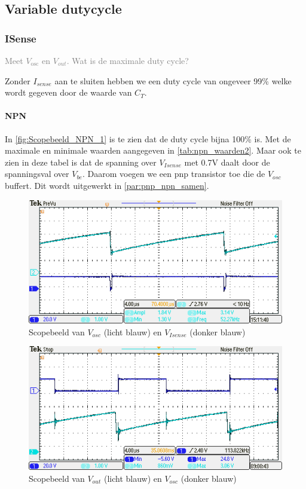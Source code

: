 \subsection{Variable dutycycle}

\subsubsection{ISense}
\textcolor{gray}{Meet \( V_{\text{osc}} \) en \(V_{out}\). Wat is de maximale duty cycle?}

Zonder \(I_{sense}\) aan te sluiten hebben we een duty cycle van ongeveer 99\% welke wordt gegeven door de waarde van \(C_T\).

\paragraph{NPN}
In \autoref{fig:Scopebeeld_NPN_1} is te zien dat de duty cycle bijna 100\% is. Met de maximale en minimale waarden aangegeven in \autoref{tab:npn_waarden2}. Maar ook te zien in deze tabel is dat de spanning over \(V_{Isense}\) met 0.7V daalt door de spanningsval over \(V_{be}\). Daarom voegen we een pnp transistor toe die de \(V_{osc}\) buffert. Dit wordt uitgewerkt in \autoref{par:pnp_npn_samen}.
 
\begin{figure}[b]
    \centering
    \includegraphics[width=0.7\linewidth]{img/hfd3/TEK00016.PNG}
    \caption{Scopebeeld van \(V_{osc}\) (licht blauw) en \(V_{Isense}\) (donker blauw)}
    \label{fig:Scopebeeld_NPN_1}
\end{figure}


\begin{figure}[b]
    \centering
    \includegraphics[width=0.7\linewidth]{img/hfd3/TEK00048.PNG}
    \caption{Scopebeeld van \(V_{out}\) (licht blauw) en \(V_{osc}\) (donker blauw)}
    \label{fig:scopebeeld_pnp_2}
\end{figure}


